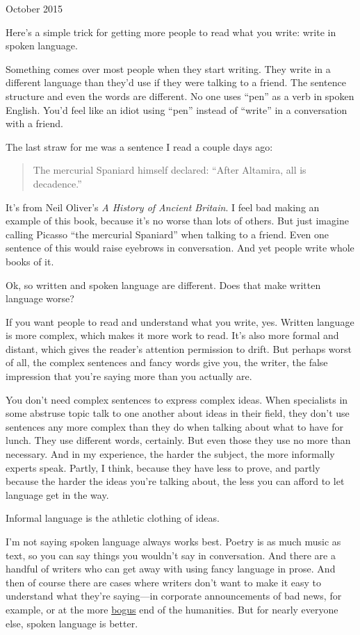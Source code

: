 October 2015

Here's a simple trick for getting more people to read what you write:
write in spoken language.

Something comes over most people when they start writing. They write in
a different language than they'd use if they were talking to a friend.
The sentence structure and even the words are different. No one uses
``pen'' as a verb in spoken English. You'd feel like an idiot using
``pen'' instead of ``write'' in a conversation with a friend.

The last straw for me was a sentence I read a couple days ago:

\begin{quote}
The mercurial Spaniard himself declared: ``After Altamira, all is
decadence.''
\end{quote}

It's from Neil Oliver's \emph{A History of Ancient Britain}. I feel bad
making an example of this book, because it's no worse than lots of
others. But just imagine calling Picasso ``the mercurial Spaniard'' when
talking to a friend. Even one sentence of this would raise eyebrows in
conversation. And yet people write whole books of it.

Ok, so written and spoken language are different. Does that make written
language worse?

If you want people to read and understand what you write, yes. Written
language is more complex, which makes it more work to read. It's also
more formal and distant, which gives the reader's attention permission
to drift. But perhaps worst of all, the complex sentences and fancy
words give you, the writer, the false impression that you're saying more
than you actually are.

You don't need complex sentences to express complex ideas. When
specialists in some abstruse topic talk to one another about ideas in
their field, they don't use sentences any more complex than they do when
talking about what to have for lunch. They use different words,
certainly. But even those they use no more than necessary. And in my
experience, the harder the subject, the more informally experts speak.
Partly, I think, because they have less to prove, and partly because the
harder the ideas you're talking about, the less you can afford to let
language get in the way.

Informal language is the athletic clothing of ideas.

I'm not saying spoken language always works best. Poetry is as much
music as text, so you can say things you wouldn't say in conversation.
And there are a handful of writers who can get away with using fancy
language in prose. And then of course there are cases where writers
don't want to make it easy to understand what they're saying---in
corporate announcements of bad news, for example, or at the more
\href{https://scholar.google.com/scholar?hl=en&as_sdt=1,5&q=transgression+narrative+postmodern+gender}{bogus}
end of the humanities. But for nearly everyone else, spoken language is
better.

